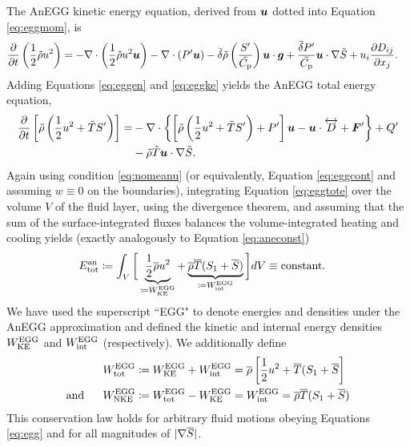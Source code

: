 \documentclass[12pt]{article}
\newcommand{\vecf}{\bm{F}}
\newcommand{\anetot}{E_{\rm tot}^{\rm an}}
\newcommand{\eggwtot}{W^{\rm EGG}_{\rm tot}}
\newcommand{\eggwke}{W^{\rm EGG}_{\rm KE}}
\newcommand{\eggwnke}{W^{\rm EGG}_{\rm NKE}}
\newcommand{\eggwint}{W^{\rm EGG}_{\rm int}}
\begin{document}
The AnEGG kinetic energy equation, derived from $\bm{u}$ dotted into Equation \eqref{eq:eggmom}, is 
	\begin{align}\label{eq:eggke}
	\frac{\partial}{\partial t}\left(\frac{1}{2}\tilde{\rho} u^2\right)&=-\nabla\cdot\left(\frac{1}{2}\tilde{\rho} u^2\bm{u} \right) - \nabla\cdot({P^\prime}\bm{u})  - \tilde{\delta} \tilde{\rho} \left(\frac{{S^\prime}}{\tilde{C_{\rm{p}}}}\right) \bm{u}\cdot \bm{g} +\frac{\tilde{\delta}  {P^\prime}}{\tilde{C_{\rm{p}}}} \bm{u}\cdot \nabla\tilde{S}  + u_i\frac{\partial D_{ij}}{\partial x_j}.
	\end{align}
Adding Equations \eqref{eq:eggen} and \eqref{eq:eggke} yields the AnEGG total energy equation,
\begin{align}\label{eq:eggtote}
	\pderiv{}{t}\left[\rhotilde\left(\frac{1}{2} u^2 + \tmptilde \entrprime \right)\right] = &-\Div\left\{\left[\rhotilde\left(\frac{1}{2} u^2 + \tmptilde \entrprime\right) + \prsprime \right]\vecu- \vecu\cdot\overleftrightarrow{D} + \vecf^\prime \right\} + Q^\prime \nonumber\\ & -\rhotilde\tmptilde\ugrad\entrtilde. 
\end{align}
Again using condition \eqref{eq:nomeanu} (or equivalently, Equation \eqref{eq:eggcont} and assuming $w\equiv0$ on the boundaries), integrating Equation \eqref{eq:eggtote} over the volume $V$ of the fluid layer, using the divergence theorem, and assuming that the sum of the surface-integrated fluxes balances the volume-integrated heating and cooling yields (exactly analogously to Equation \eqref{eq:aneconst})
\begin{align}\label{eq:eggeconst}
	\anetot &\define \int_V \bigg{[}  \underbrace{\frac{1}{2}\rhoover u^2}_{\define \eggwke} + \underbrace{\rhoover \tmpover (\entrone+\entrover)}_{\define\eggwint} \bigg{]} dV \equiv \text{constant}.
\end{align}
We have used the superscript ``EGG" to denote energies and densities under the AnEGG approximation and defined the kinetic and internal energy densities $\eggwke$ and $\eggwint$ (respectively). We additionally define
\begin{subequations}\label{eq:eggwtotnke}
	\begin{align}
		\eggwtot &\define \eggwke + \eggwint = \rhoover\left[\frac{1}{2}u^2 + \tmpover(\entrone+\entrover \right]\label{eq:eggwtot}\\
		\andd \eggwnke &\define \eggwtot - \eggwke = \eggwint =\rhoover \tmpover (\entrone+\entrover)\label{eq:eggwnke}
	\end{align}
\end{subequations}
This conservation law holds for arbitrary fluid motions obeying Equations \eqref{eq:egg} and for all magnitudes of $|\nabla\overline{S}|$. 
\end{document}
